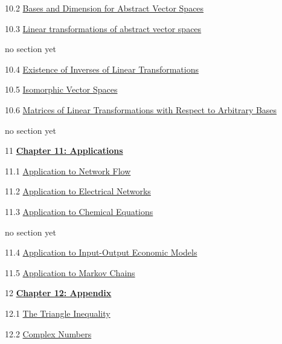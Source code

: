 \documentclass{ximera}
\begin{document}
10.2	\href{https://ximera.osu.edu/oerlinalg/LinearAlgebra/VSP-0060/main}{Bases and Dimension for Abstract Vector Spaces}
	
10.3	\href{https://ximera.osu.edu/oerlinalg/LinearAlgebra/LTR-0022/main}{Linear transformations of abstract vector spaces}
	
	no section yet
	
10.4	\href{https://ximera.osu.edu/oerlinalg/LinearAlgebra/LTR-0035/main}{Existence of Inverses of Linear Transformations}
	
10.5	\href{https://ximera.osu.edu/oerlinalg/LinearAlgebra/LTR-0060/main}{Isomorphic Vector Spaces}
	
10.6	\href{https://ximera.osu.edu/oerlinalg/LinearAlgebra/LTR-0080/main}{Matrices of Linear Transformations with Respect to Arbitrary Bases}
	
	no section yet
	
11	\href{https://ximera.osu.edu/oerlinalg/LinearAlgebra/XLAChapter_applications/main}{\textbf{Chapter 11: Applications}}
	
11.1	\href{https://ximera.osu.edu/oerlinalg/LinearAlgebra/APP-0010/main}{Application to Network Flow}
	
11.2	\href{https://ximera.osu.edu/oerlinalg/LinearAlgebra/APP-0020/main}{Application to Electrical Networks}
	
11.3	\href{https://ximera.osu.edu/oerlinalg/LinearAlgebra/APP-0030/main}{Application to Chemical Equations}
	
	no section yet
	
11.4	\href{https://ximera.osu.edu/oerlinalg/LinearAlgebra/APP-0050/main}{Application to Input-Output Economic Models}
	
11.5	\href{https://ximera.osu.edu/oerlinalg/LinearAlgebra/APP-0060/main}{Application to Markov Chains}
	
	
	
	
	
	
	
12	\href{https://ximera.osu.edu/oerlinalg/LinearAlgebra/XLAChapter_appendix/main}{\textbf{Chapter 12: Appendix}}
	
12.1	\href{https://ximera.osu.edu/oerlinalg/LinearAlgebra/APX-0010/main}{The Triangle Inequality}
	
12.2	\href{https://ximera.osu.edu/oerlinalg/LinearAlgebra/APX-0020/main}{Complex Numbers}
	
\end{document}
